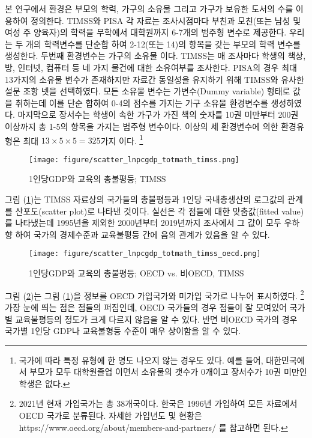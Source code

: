 본 연구에서 환경은 부모의 학력, 가구의 소유물 그리고 가구가 보유한 도서의 수를 이용하여 정의한다.
TIMSS와 PISA 각 자료는 조사시점마다 부친과 모친(또는 남성 및 여성 주 양육자)의 학력을 무학에서 대학원까지 6-7개의 범주형 변수로 제공한다.
우리는 두 개의 학력변수를 단순합 하여 2-12(또는 14)의 항목을 갖는 부모의 학력 변수를 생성한다.
두번째 환경변수는 가구의 소유물 이다.
TIMSS는 매 조사마다 학생의 책상, 방, 인터넷, 컴퓨터 등 네 가지 물건에 대한 소유여부를 조사한다.
PISA의 경우 최대 13가지의 소유물 변수가 존재하지만 자료간 동일성을 유지하기 위해 TIMSS와 유사한 설문 조항 넷을 선택하였다.
모든 소유물 변수는 가변수(Dummy variable) 형태로 값을 취하는데 이를 단순 합하여 0-4의 점수를 가지는 가구 소유물 환경변수를 생성하였다.
마지막으로 장서수는 학생이 속한 가구가 가진 책의 숫자를 10권 미만부터 200권 이상까지 총 1-5의 항목을 가지는 범주형 변수이다.
이상의 세 환경변수에 의한 환경유형은 최대 $13 \times 5 \times 5 = 325$가지 이다.
\footnote{국가에 따라 특정 유형에 한 명도 나오지 않는 경우도 있다.
    예를 들어, 대한민국에서 부모가 모두 대학원졸업 이면서 소유물의 갯수가 0개이고 장서수가 10권 미만인 학생은 없다.} 

\begin{figure}
    \centering
    \texttt{[image: figure/scatter\_lnpcgdp\_totmath\_timss.png]}
    \caption{1인당GDP와 교육의 총불평등; TIMSS}
    \label{fig:scatter_timss_lnpcgdp_bjtmath}
\end{figure}
그림 (\ref{fig:scatter_timss_lnpcgdp_bjtmath})는 TIMSS 자료상의 국가들의 총불평등과 1인당 국내총생산의 로그값의 관계를 산포도(scatter plot)로 나타낸 것이다.
실선은 각 점들에 대한 맞춤값(fitted value)를 나타냈는데 1995년을 제외한 2000년부터 2019년까지 조사에서 그 값이 모두 우하향 하여 국가의 경제수준과 교육불평등 간에 음의 관계가 있음을 알 수 있다. 

\begin{figure}
    \centering
    \texttt{[image: figure/scatter\_lnpcgdp\_totmath\_timss\_oecd.png]}
    \caption{1인당GDP와 교육의 총불평등; OECD vs. 비OECD, TIMSS}
    \label{fig:scatter_timss_lnpcgdp_bjtmath_oecd}
\end{figure}
그림 (\ref{fig:scatter_timss_lnpcgdp_bjtmath_oecd})는 그림 (\ref{fig:scatter_timss_lnpcgdp_bjtmath})을 정보를 OECD 가입국가와 미가입 국가로 나누어 표시하였다.
\footnote{2021년 현재 가입국가는 총 38개국이다. 한국은 1996년 가입하여 모든 자료에서 OECD 국가로 분류된다. 자세한 가입년도 및 현황은 https://www.oecd.org/about/members-and-partners/ 를 참고하면 된다.}
가장 눈에 띄는 점은 점들의 퍼짐인데, OECD 국가들의 경우 점들이 잘 모여있어 국가별 교육불평등의 정도가 크게 다르지 않음을 알 수 있다. 반면 비OECD 국가의 경우 국가별 1인당 GDP나 교육불형등 수준이 매우 상이함을 알 수 있다.

